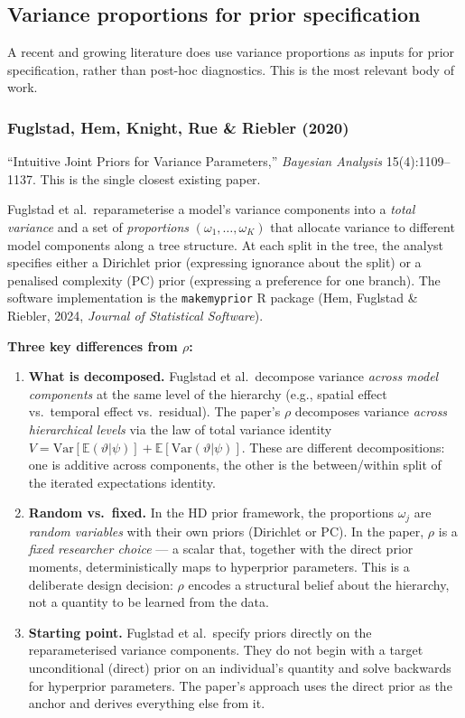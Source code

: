 \documentclass[12pt,a4paper]{article}
\newcommand{\E}{\mathbb{E}}
\newcommand{\Var}{\mathrm{Var}}
\begin{document}
\subsection{Variance proportions for prior specification}

A recent and growing literature does use variance proportions as inputs for
prior specification, rather than post-hoc diagnostics. This is the most
relevant body of work.

\subsubsection{Fuglstad, Hem, Knight, Rue \& Riebler (2020)}

``Intuitive Joint Priors for Variance Parameters,'' \emph{Bayesian Analysis}
15(4):1109--1137. This is the single closest existing paper.

Fuglstad et al.\ reparameterise a model's variance components into a
\emph{total variance} and a set of \emph{proportions} $(\omega_1, \ldots,
\omega_K)$ that allocate variance to different model components along a tree
structure. At each split in the tree, the analyst specifies either a Dirichlet
prior (expressing ignorance about the split) or a penalised complexity (PC)
prior (expressing a preference for one branch). The software implementation is
the \texttt{makemyprior} R package (Hem, Fuglstad \& Riebler, 2024,
\emph{Journal of Statistical Software}).

\medskip
\noindent\textbf{Three key differences from $\rho$:}

\begin{enumerate}[label=(\alph*)]
  \item \textbf{What is decomposed.} Fuglstad et al.\ decompose variance
    \emph{across model components} at the same level of the hierarchy (e.g.,
    spatial effect vs.\ temporal effect vs.\ residual). The paper's $\rho$
    decomposes variance \emph{across hierarchical levels} via the law of total
    variance identity $V = \Var[\E(\vartheta|\psi)] + \E[\Var(\vartheta|\psi)]$.
    These are different decompositions: one is additive across components, the
    other is the between/within split of the iterated expectations identity.

  \item \textbf{Random vs.\ fixed.} In the HD prior framework, the proportions
    $\omega_j$ are \emph{random variables} with their own priors (Dirichlet or
    PC). In the paper, $\rho$ is a \emph{fixed researcher choice} --- a scalar
    that, together with the direct prior moments, deterministically maps to
    hyperprior parameters. This is a deliberate design decision: $\rho$
    encodes a structural belief about the hierarchy, not a quantity to be
    learned from the data.

  \item \textbf{Starting point.} Fuglstad et al.\ specify priors directly on
    the reparameterised variance components. They do not begin with a target
    unconditional (direct) prior on an individual's quantity and solve backwards
    for hyperprior parameters. The paper's approach uses the direct prior as the
    anchor and derives everything else from it.
\end{enumerate}
\end{document}
